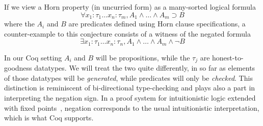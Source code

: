 If we view  a Horn property (in uncurried form) as a many-sorted logical formula
\[
  \forall x_1 \colon \tau_1\dots x_n \colon \tau_m, A_1\land\dots\land A_m \supset B\tag{*}\label{eq:prop}
  \]
  where the $A_i$ and $B$ are  predicates defined
using Horn clause specifications, a counter-example to this conjecture
consists of a witness of the negated formula
\[
  \exists x_1 \colon \tau_1\dots x_n \colon \tau_n , A_1\land\dots\land A_m\wedge \neg B
  \tag{**}\label{eq:full}
\]

In our Coq  setting $A_i$ and $B$ will be 
propositions, while the $\tau_j$ are honest-to-goodness datatypes. We
will treat the two quite differently, in so far as elements of those
datatypes will be \emph{generated}, while predicates will only be
\emph{checked}. This distinction is reminiscent of bi-directional
type-checking and  plays also a part in interpreting the
negation sign.
%
In a proof system for intuitionistic logic extended with fixed
points~\cite{baelde12tocl}, negation corresponds to the usual
intuitionistic interpretation, which is  what Coq supports.  %
%

